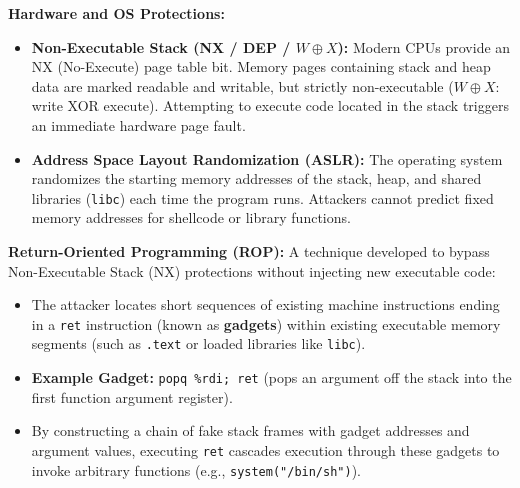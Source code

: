 \begin{definition}
    \textbf{Hardware and OS Protections:}
    \begin{itemize}
        \item \textbf{Non-Executable Stack (NX / DEP / $W \oplus X$):} Modern CPUs provide an NX (No-Execute) page table bit. Memory pages containing stack and heap data are marked readable and writable, but strictly non-executable ($W \oplus X$: write XOR execute). Attempting to execute code located in the stack triggers an immediate hardware page fault.
        \item \textbf{Address Space Layout Randomization (ASLR):} The operating system randomizes the starting memory addresses of the stack, heap, and shared libraries (\texttt{libc}) each time the program runs. Attackers cannot predict fixed memory addresses for shellcode or library functions.
    \end{itemize}
\end{definition}

\begin{definition}
    \textbf{Return-Oriented Programming (ROP):}
    A technique developed to bypass Non-Executable Stack (NX) protections without injecting new executable code:
    \begin{itemize}
        \item The attacker locates short sequences of existing machine instructions ending in a \texttt{ret} instruction (known as \textbf{gadgets}) within existing executable memory segments (such as \texttt{.text} or loaded libraries like \texttt{libc}).
        \item \textbf{Example Gadget:} \texttt{popq \%rdi; ret} (pops an argument off the stack into the first function argument register).
        \item By constructing a chain of fake stack frames with gadget addresses and argument values, executing \texttt{ret} cascades execution through these gadgets to invoke arbitrary functions (e.g., \texttt{system("/bin/sh")}).
    \end{itemize}
\end{definition}